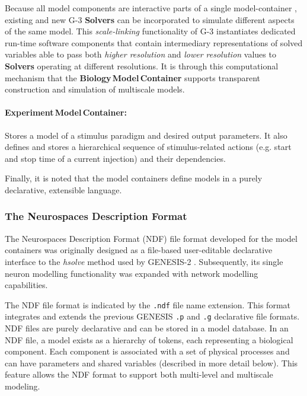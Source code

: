 \documentclass[11pt,3p,twocolumn]{JMN}
\begin{document}
Because all model components are interactive parts of a single model-container \cite{cornelis12}, existing and new G-3 {\bf Solvers} can be incorporated to simulate different aspects of the same model.  This {\em scale-linking} functionality of G-3 instantiates dedicated run-time software components that contain intermediary representations of solved variables able to pass both {\em higher resolution} and {\em lower resolution} values to {\bf Solvers} operating at different resolutions.
It is through this computational mechanism that the {\bf Biology\,Model\,Container} supports transparent construction and simulation of multiscale models.

\paragraph{Experiment\,Model\,Container:} Stores a model of a stimulus paradigm and desired output parameters. It also defines and stores a hierarchical sequence of stimulus-related
actions (e.g. start and stop time of a current injection) and their dependencies.

Finally, it is noted that the model containers define models in a purely declarative,
extensible language.

\subsubsection{The Neurospaces Description Format}

The Neurospaces Description Format (NDF) file format developed for the model containers was originally designed as a file-based user-editable declarative interface to the {\it hsolve} method used by GENESIS-2 \cite{cornelis03:_inter_model_space_simul_space,beeman13:_years_comput_neuros}. Subsequently, its single neuron modelling functionality was expanded with network modelling capabilities.

The NDF file format is indicated by the {\tt .ndf} file name extension. This format integrates and extends the previous GENESIS {\tt .p} and {\tt .g} declarative file formats. NDF files are purely declarative and can be stored in a model database. In an NDF file, a
model exists as a hierarchy of tokens, each representing a biological component.  Each component is associated with a set of physical processes and can have parameters and shared variables (described in more detail below).  This feature allows the NDF format to support
both multi-level and multiscale modeling.
\end{document}
